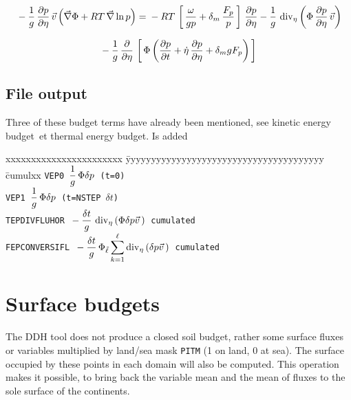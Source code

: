$$ \mb - \frac 1g\,\DerP p{\eta} \,\vec v \lp \grad\Phi + RT\,\grad \ln p \rp = \mb - RT \lc \frac{\omega}{gp} 
+ \delta_m \,\frac{\fp{}}p \rc \DerP p{\eta} - \frac 1g \,\divi{\eta} \lp \Phi\,\DerP p{\eta}\,\vec 
v \rp $$

$$ \mb - \frac 1g\,\DerP{}{\eta} \lc \Phi \lp \DerP pt + \dot\eta\,\DerP p{\eta} + \delta_m g \fp{} 
\rp \rc $$

\subsection*{File output}

Three of these budget terms have already been mentioned, see \og kinetic energy budget\fg\ et \og thermal energy budget\fg. Is added
\begin{tabbing}
xxxxxxxxxxxxxxxxxxxxxxx \= yyyyyyyyyyyyyyyyyyyyyyyyyyyyyyyyyyyyyyy \= cumulxx \kill
\tt VEP0 \> $\displaystyle\frac 1g\,\Phi \delta p$ (t=0) \\[1ex]
\tt VEP1 \> $\displaystyle\frac 1g\,\Phi \delta p$ (t=NSTEP $\delta t$) \\[1ex]
\tt TEPDIVFLUHOR \> $\ds\mb-\frac{\delta t}g\,\divi{\eta} \lp\Phi \delta p \vec v\,\rp$ \> cumulated\\[1ex]
\tt FEPCONVERSIFL \> $\ds\mb -\frac{\delta t}g \,\Phi_{\tilde\ell} \sum_{k=1}^\ell \divi{\eta}\lp \delta 
p \vec v\,\rp$ \> cumulated
\end{tabbing}

\section{Surface budgets}
\label{BSC}

The DDH tool does not produce a closed soil budget, rather some surface fluxes or variables multiplied by land/sea mask {\tt PITM} 
(1 on land, 0 at sea). The surface occupied by these points in each domain will also be computed. This operation makes it possible, to bring back the variable mean and the mean of fluxes to the sole surface of the continents. 

